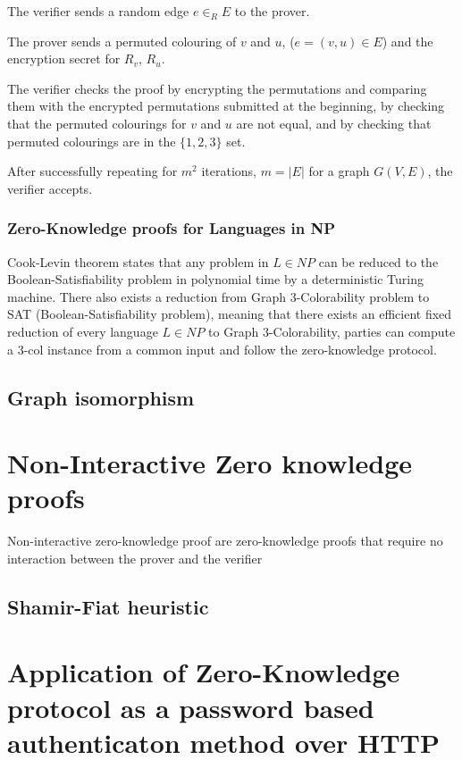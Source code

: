 \documentclass[12pt,a4paper]{article}
\begin{document}
The verifier sends a random edge $e \in_R E$ to the prover.

The prover sends a permuted colouring of $v$ and $u$, ($e = (v, u) \in E$) and the encryption secret for $R_v$, $R_u$.

The verifier checks the proof by encrypting the permutations and comparing them with the encrypted permutations submitted at the beginning, by checking that the permuted colourings for $v$ and $u$ are not equal, and by checking that permuted colourings are in the $\{1, 2, 3\}$ set.

After successfully repeating for $m^2$ iterations, $m = | E |$ for a graph $G(V,E)$, the verifier accepts.

\subsubsection{Zero-Knowledge proofs for Languages in NP}
Cook-Levin theorem states that any problem in $L \in NP$ can be reduced to the Boolean-Satisfiability problem in polynomial time by a deterministic Turing machine.
There also exists a reduction from Graph 3-Colorability problem to SAT (Boolean-Satisfiability problem), meaning that there exists an efficient fixed reduction of every language $L \in NP$ to Graph 3-Colorability, parties can compute a 3-col instance from a common input and follow the zero-knowledge protocol.



\subsection{Graph isomorphism}
\section{Non-Interactive Zero knowledge proofs}
Non-interactive zero-knowledge proof are zero-knowledge proofs that require no interaction between the prover and the verifier

\subsection{Shamir-Fiat heuristic}

\section{Application of Zero-Knowledge protocol as a password based authenticaton method over HTTP}

\printbibliography
\end{document}
